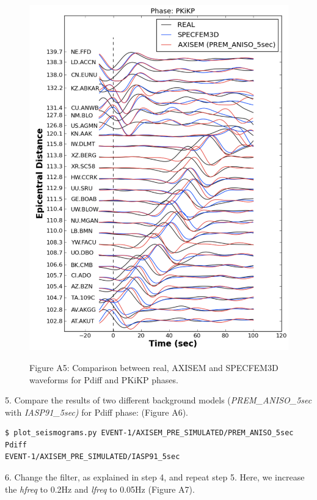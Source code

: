 \documentclass{article}
\begin{document}
\begin{figure}
\begin{minipage}{.5\textwidth}
  \includegraphics[width=1.\linewidth]{AXISEMTutorial-fig011.pdf}
\end{minipage}
\begin{center}
{\small{}Figure A5: Comparison between real, AXISEM and SPECFEM3D waveforms for 
Pdiff and PKiKP phases.}
\end{center}
\end{figure}

5. Compare the results of two different background models (\textit{PREM\_ANISO\_5sec} with 
\textit{IASP91\_5sec)} for Pdiff phase: (Figure A6).

\begin{verbatim}
$ plot_seismograms.py EVENT-1/AXISEM_PRE_SIMULATED/PREM_ANISO_5sec Pdiff 
EVENT-1/AXISEM_PRE_SIMULATED/IASP91_5sec
\end{verbatim}

6. Change the filter, as explained in step 4, and repeat step 5. Here, we increase 
the \textit{hfreq} to 0.2Hz and \textit{lfreq} to 0.05Hz (Figure A7).
\end{document}
